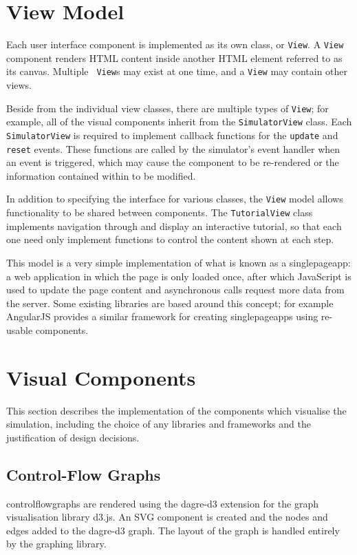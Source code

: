 \documentclass[bsc,twoside,singlespacing,parskip,logo,notimes,normalheadings]{infthesis}
\begin{document}
    \section{View Model}
    
    Each user interface component is implemented as its own class, or
    {\tt View}. A {\tt View} component renders HTML content inside
    another HTML element referred to as its canvas. Multiple {\tt
      View}s may exist at one time, and a {\tt View} may contain other
    views. 

    Beside from the individual view classes, there are multiple types
    of {\tt View}; for example, all of the visual components inherit
    from the {\tt SimulatorView} class. Each {\tt SimulatorView} is
    required to implement callback functions for the {\tt update} and
    {\tt reset} events.  These functions are called by the simulator's
    event handler when an event is triggered, which may cause the
    component to be re-rendered or the information contained within to
    be modified.
    
    In addition to specifying the interface for various classes, the
    {\tt View} model allows functionality to be shared between
    components. The {\tt TutorialView} class implements navigation
    through and display an interactive tutorial, so that each one need
    only implement functions to control the content shown at each
    step.

    This model is a very simple implementation of what is known as a
    \gls{singlepageapp}: a web application in which the page is only
    loaded once, after which JavaScript is used to update the page
    content and asynchronous calls request more data from the
    server. Some existing libraries are based around this concept; for
    example AngularJS\cite{angularjs} provides a similar framework for
    creating \gls{singlepageapp}s using re-usable components.
    
    \section{Visual Components}
    This section describes the implementation of the components which
    visualise the simulation, including the choice of any libraries
    and frameworks and the justification of design decisions.

        \subsection{Control-Flow Graphs}\label{sec:impl-visual-cfg}
        \Gls{controlflowgraph}s are rendered using the dagre-d3
        extension for the graph visualisation library d3.js. An SVG
        component is created and the nodes and edges added to the
        dagre-d3 graph. The layout of the graph is handled entirely by
        the graphing library.
\end{document}
